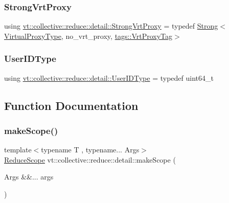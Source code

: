 \subsubsection{\texorpdfstring{Strong\+Vrt\+Proxy}{StrongVrtProxy}}
{\footnotesize\ttfamily using \hyperlink{namespacevt_1_1collective_1_1reduce_1_1detail_a492943cffff6d1a92386468d46f589df}{vt\+::collective\+::reduce\+::detail\+::\+Strong\+Vrt\+Proxy} = typedef \hyperlink{structvt_1_1collective_1_1reduce_1_1detail_1_1_strong}{Strong}$<$\hyperlink{namespacevt_a1b417dd5d684f045bb58a0ede70045ac}{Virtual\+Proxy\+Type}, no\+\_\+vrt\+\_\+proxy, \hyperlink{structvt_1_1collective_1_1reduce_1_1detail_1_1tags_1_1_vrt_proxy_tag}{tags\+::\+Vrt\+Proxy\+Tag}$>$}

\mbox{\label{namespacevt_1_1collective_1_1reduce_1_1detail_ae82d7b96b0885b9b7dfb0104398beead}} 
\subsubsection{\texorpdfstring{User\+I\+D\+Type}{UserIDType}}
{\footnotesize\ttfamily using \hyperlink{namespacevt_1_1collective_1_1reduce_1_1detail_ae82d7b96b0885b9b7dfb0104398beead}{vt\+::collective\+::reduce\+::detail\+::\+User\+I\+D\+Type} = typedef uint64\+\_\+t}



\subsection{Function Documentation}
\mbox{\label{namespacevt_1_1collective_1_1reduce_1_1detail_addecbceb802231d2689ccc0c4fc8980f}} 
\subsubsection{\texorpdfstring{make\+Scope()}{makeScope()}}
{\footnotesize\ttfamily template$<$typename T , typename... Args$>$ \\
\hyperlink{structvt_1_1collective_1_1reduce_1_1detail_1_1_reduce_scope}{Reduce\+Scope} vt\+::collective\+::reduce\+::detail\+::make\+Scope (\begin{DoxyParamCaption}\item[{Args \&\&...}]{args }\end{DoxyParamCaption})\hspace{0.3cm}{\ttfamily [inline]}}



